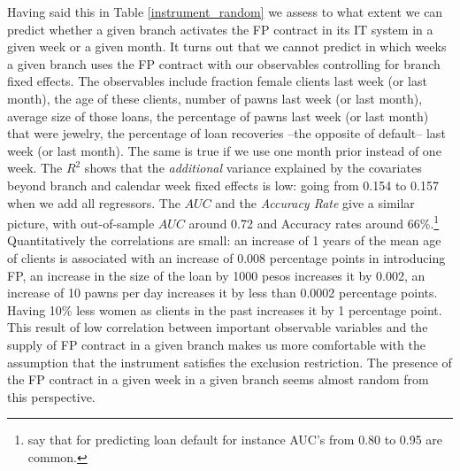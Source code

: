 \documentclass[oneside,11pt]{article}
\begin{document}
Having said this in Table \ref{instrument_random} we assess to what extent we can predict whether a given branch activates the FP contract in its IT system in a given week or a given month. It turns out that we cannot predict in which weeks a given branch uses the FP contract with our observables controlling for branch fixed effects. The observables include fraction female clients last week (or last month), the age of these clients, number of pawns last week (or last month), average size of those loans, the percentage of pawns last week (or last month) that were jewelry, the percentage of loan recoveries --the opposite of default-- last week (or last month). The same is true if we use one month prior instead of one week. The $R^2$ shows that the \textit{additional} variance explained by the covariates beyond branch and calendar week fixed effects is low: going from 0.154 to 0.157 when we add all regressors. The $AUC$ and the \textit{Accuracy Rate} give a similar picture, with out-of-sample $AUC$ around 0.72 and Accuracy rates around 66\%.\footnote{\cite{Finanzia} say that for predicting loan default for instance AUC's from 0.80 to 0.95 are common.} \\ %

Quantitatively the correlations are small: an increase of 1 years of the mean age of clients is associated with an increase of 0.008 percentage points in introducing FP, an increase in the size of the loan by 1000 pesos increases it by 0.002, an increase of 10 pawns per day increases it by less than 0.0002 percentage points. Having 10\% less women as clients in the past increases it by 1 percentage point. This result of low correlation between important observable variables and the supply of FP contract in a given branch makes us more comfortable with the assumption that the instrument satisfies the exclusion restriction. The presence of the FP contract in a given week in a given branch seems almost random from this perspective.
\end{document}
